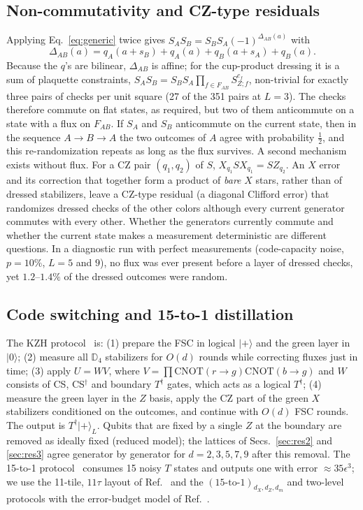 \documentclass[a4paper]{article}
\newcommand{\rd}{r}
\newcommand{\gr}{g}
\newcommand{\bl}{b}
\providecommand{\ket}[1]{\ensuremath{|#1\rangle}}
\begin{document}
\subsection{Non-commutativity and CZ-type residuals}
\label{sec:noncomm}

Applying Eq.~\eqref{eq:generic} twice gives $S_AS_B=S_BS_A(-1)^{\Delta_{AB}(a)}$ with
\begin{equation}
  \Delta_{AB}(a)=q_A(a+s_B)+q_A(a)+q_B(a+s_A)+q_B(a).
  \label{eq:delta}
\end{equation}
Because the $q$'s are bilinear, $\Delta_{AB}$ is affine; for the cup-product dressing it is a sum of plaquette constraints, $S_AS_B=S_BS_A\prod_{f\in F_{AB}}S^{c_f}_{Z;f}$, non-trivial for exactly three pairs of checks per unit square (27 of the 351 pairs at $L=3$). The checks therefore commute on flat states, as required, but two of them anticommute on a state with a flux on $F_{AB}$. If $S_A$ and $S_B$ anticommute on the current state, then in the sequence $A\to B\to A$ the two outcomes of $A$ agree with probability $\tfrac12$, and this re-randomization repeats as long as the flux survives. A second mechanism exists without flux. For a CZ pair $(q_1,q_2)$ of $S$, $X_{q_1}SX_{q_1}=SZ_{q_2}$. An $X$ error and its correction that together form a product of \emph{bare} $X$ stars, rather than of dressed stabilizers, leave a CZ-type residual (a diagonal Clifford error) that randomizes dressed checks of the other colors although every current generator commutes with every other. Whether the generators currently commute and whether the current state makes a measurement deterministic are different questions. In a diagnostic run with perfect measurements (code-capacity noise, $p=10\%$, $L=5$ and $9$), no flux was ever present before a layer of dressed checks, yet $1.2$--$1.4\%$ of the dressed outcomes were random.

\subsection{Code switching and 15-to-1 distillation}
\label{sec:protocols}

The KZH protocol~\cite{kobayashi2025clifford} is: (1) prepare the FSC in logical $\ket{+}$ and the green layer in $\ket{0}$; (2) measure all $\mathbb{D}_4$ stabilizers for $O(d)$ rounds while correcting fluxes just in time; (3) apply $U=WV$, where $V=\prod\mathrm{CNOT}(\rd\to\gr)\mathrm{CNOT}(\bl\to\gr)$ and $W$ consists of CS, CS$^\dagger$ and boundary $T^\dagger$ gates, which acts as a logical $T^\dagger$; (4) measure the green layer in the $Z$ basis, apply the CZ part of the green $X$ stabilizers conditioned on the outcomes, and continue with $O(d)$ FSC rounds. The output is $T^\dagger\ket{+}_L$. Qubits that are fixed by a single $Z$ at the boundary are removed as ideally fixed (reduced model); the lattices of Secs.~\ref{sec:res2} and \ref{sec:res3} agree generator by generator for $d=2,3,5,7,9$ after this removal. The 15-to-1 protocol~\cite{bravyikitaev2005} consumes 15 noisy $T$ states and outputs one with error $\approx35\epsilon^3$; we use the 11-tile, $11\tau$ layout of Ref.~\cite{litinski2019game} and the $(15\text{-to-}1)_{d_X,d_Z,d_m}$ and two-level protocols with the error-budget model of Ref.~\cite{litinski2019magic}.
\end{document}
